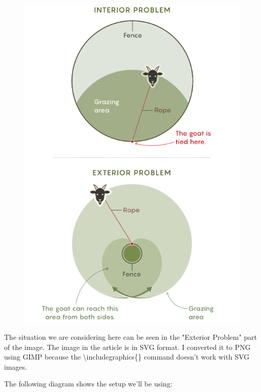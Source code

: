 \documentclass{article}
\begin{document}
\begin{figure}[h]
\includegraphics[scale=0.35]{Grazing-goat-figure}
\centering
\end{figure}

The situation we are considering here can be seen in the "Exterior Problem" part of the image. The image in the article is in SVG format. I converted it to PNG using GIMP because the \textbackslash includegraphics\{\} command doesn't work with SVG images.

The following diagram shows the setup we'll be using:
\end{document}
